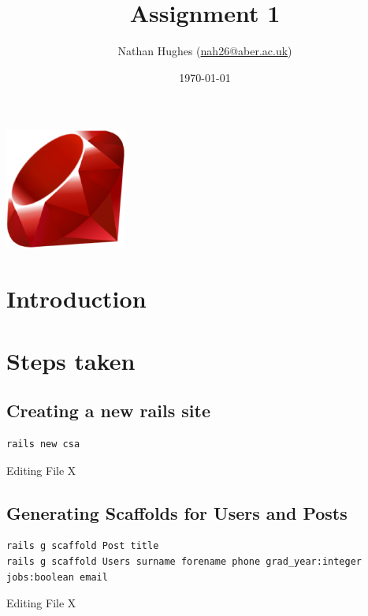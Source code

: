 \documentclass[a4paper]{article}
\author{Nathan Hughes (\href{mailto:nah31@aber.ac.uk}{nah26@aber.ac.uk})}
\date{\today}
\title{Assignment 1}
\begin{document}
\maketitle
\vspace{2cm}

\begin{center}
\includegraphics[width=4cm]{./ruby.png}
\end{center}

\clearpage
\tableofcontents
\clearpage


\section{Introduction}
\label{sec-1}

\section{Steps taken}
\label{sec-2}

\subsection{Creating a new rails site}
\label{sec-2-1}
\begin{listing}[H]
\begin{verbatim}
rails new csa
\end{verbatim}
\caption{Editing File X}
\end{listing}

\subsection{Generating Scaffolds for Users and Posts}
\label{sec-2-2}
\begin{listing}[H]
\begin{verbatim}
rails g scaffold Post title
rails g scaffold Users surname forename phone grad_year:integer jobs:boolean email
\end{verbatim}
\caption{Editing File X}
\end{listing}
\end{document}
